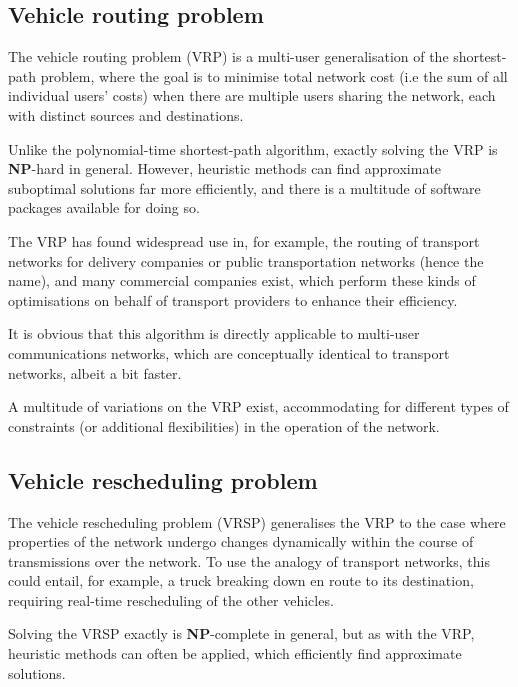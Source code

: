 %
%

\subsection{Vehicle routing problem} \label{sec:VRP} 

The vehicle routing problem (VRP) is a multi-user generalisation of the shortest-path problem, where the goal is to minimise total network cost (i.e the sum of all individual users' costs) when there are multiple users sharing the network, each with distinct sources and destinations.

Unlike the polynomial-time shortest-path algorithm, exactly solving the VRP is \textbf{NP}-hard in general. However, heuristic methods can find approximate suboptimal solutions far more efficiently, and there is a multitude of software packages available for doing so.

The VRP has found widespread use in, for example, the routing of transport networks for delivery companies or public transportation networks (hence the name), and many commercial companies exist, which perform these kinds of optimisations on behalf of transport providers to enhance their efficiency.

It is obvious that this algorithm is directly applicable to multi-user communications networks, which are conceptually identical to transport networks, albeit a bit faster. 

A multitude of variations on the VRP exist, accommodating for different types of constraints (or additional flexibilities) in the operation of the network.

%
%

\subsection{Vehicle rescheduling problem} \label{sec:VRSP} 

The vehicle rescheduling problem (VRSP) generalises the VRP to the case where properties of the network undergo changes dynamically within the course of transmissions over the network. To use the analogy of transport networks, this could entail, for example, a truck breaking down en route to its destination, requiring real-time rescheduling of the other vehicles.

Solving the VRSP exactly is \textbf{NP}-complete in general, but as with the VRP, heuristic methods can often be applied, which efficiently find approximate solutions.

